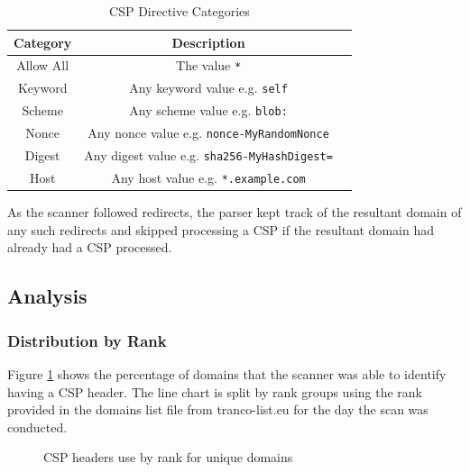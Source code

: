 \documentclass{mscreport}
\begin{document}
\begin{table}[t]
  \begin{center}
    \begin{tabular}{|c|c|c|}  %
      \hline
      \textbf{Category} & \textbf{Description}\\
      \hline
      Allow All & The value \texttt{*}\\
      \hline
      Keyword & Any keyword value e.g. \texttt{self}\\
      \hline
      Scheme & Any scheme value e.g. \texttt{blob:}\\
      \hline
      Nonce & Any nonce value e.g. \texttt{nonce-MyRandomNonce}\\
      \hline
      Digest & Any digest value e.g. \texttt{sha256-MyHashDigest=}\\
      \hline
      Host & Any host value e.g. \texttt{*.example.com}\\
      \hline
    \end{tabular}
    \caption{CSP Directive Categories}
    \label{table:directive_categories} %
  \end{center}
\end{table}

\vspace{0.3cm} \noindent
As the scanner followed redirects, the parser kept track of the resultant domain of any such redirects and skipped processing a CSP if the resultant domain had already had a CSP processed.


\subsection{Analysis}

\subsubsection{Distribution by Rank}

\noindent
Figure \ref{fig:csp_by_rank} shows the percentage of domains that the scanner was able to identify having a CSP header. The line chart is split by rank groups using the rank provided in the domains list file from tranco-list.eu for the day the scan was conducted.

\begin{figure}[H]
	\begin{center}
		\caption{CSP headers use by rank for unique domains}
		\label{fig:csp_by_rank}
	\end{center}
\end{figure}
\end{document}
